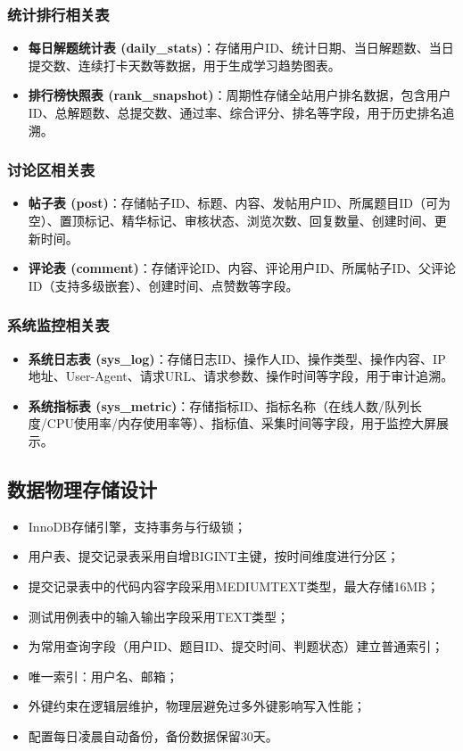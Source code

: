 \documentclass{../template/softeng}
\begin{document}
\subsubsection{统计排行相关表}
\begin{itemize}
	\item \textbf{每日解题统计表 (daily\_stats)}：存储用户ID、统计日期、当日解题数、当日提交数、连续打卡天数等数据，用于生成学习趋势图表。
	\item \textbf{排行榜快照表 (rank\_snapshot)}：周期性存储全站用户排名数据，包含用户ID、总解题数、总提交数、通过率、综合评分、排名等字段，用于历史排名追溯。
\end{itemize}

\subsubsection{讨论区相关表}
\begin{itemize}
	\item \textbf{帖子表 (post)}：存储帖子ID、标题、内容、发帖用户ID、所属题目ID（可为空）、置顶标记、精华标记、审核状态、浏览次数、回复数量、创建时间、更新时间。
	\item \textbf{评论表 (comment)}：存储评论ID、内容、评论用户ID、所属帖子ID、父评论ID（支持多级嵌套）、创建时间、点赞数等字段。
\end{itemize}

\subsubsection{系统监控相关表}
\begin{itemize}
	\item \textbf{系统日志表 (sys\_log)}：存储日志ID、操作人ID、操作类型、操作内容、IP地址、User-Agent、请求URL、请求参数、操作时间等字段，用于审计追溯。
	\item \textbf{系统指标表 (sys\_metric)}：存储指标ID、指标名称（在线人数/队列长度/CPU使用率/内存使用率等）、指标值、采集时间等字段，用于监控大屏展示。
\end{itemize}

\subsection{数据物理存储设计}
\begin{itemize}
	\item InnoDB存储引擎，支持事务与行级锁；
	\item 用户表、提交记录表采用自增BIGINT主键，按时间维度进行分区；
	\item 提交记录表中的代码内容字段采用MEDIUMTEXT类型，最大存储16MB；
	\item 测试用例表中的输入输出字段采用TEXT类型；
	\item 为常用查询字段（用户ID、题目ID、提交时间、判题状态）建立普通索引；
	\item 唯一索引：用户名、邮箱；
	\item 外键约束在逻辑层维护，物理层避免过多外键影响写入性能；
	\item 配置每日凌晨自动备份，备份数据保留30天。
\end{itemize}
\end{document}
